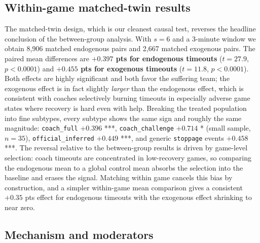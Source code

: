 \documentclass[twoside,11pt]{article}
\begin{document}
\subsection{Within-game matched-twin results}

The matched-twin design, which is our cleanest causal test, reverses the headline conclusion of the
between-group analysis. With $s = 6$ and a 3-minute window we obtain 8{,}906 matched endogenous pairs and
2{,}667 matched exogenous pairs. The paired mean differences are \textbf{$+0.397$ pts for endogenous
timeouts} ($t = 27.9$, $p < 0.0001$) and \textbf{$+0.455$ pts for exogenous timeouts} ($t = 11.8$,
$p < 0.0001$). Both effects are highly significant and both favor the suffering team; the exogenous effect
is in fact slightly \emph{larger} than the endogenous effect, which is consistent with coaches selectively
burning timeouts in especially adverse game states where recovery is hard even with help. Breaking the
treated population into fine subtypes, every subtype shows the same sign and roughly the same magnitude:
\texttt{coach\_full} $+0.396$ ***, \texttt{coach\_challenge} $+0.714$ * (small sample, $n = 35$),
\texttt{official\_inferred} $+0.449$ ***, and generic \texttt{stoppage} events $+0.458$ ***. The reversal
relative to the between-group results is driven by game-level selection: coach timeouts are concentrated in
low-recovery games, so comparing the endogenous mean to a global control mean absorbs the selection into the
baseline and erases the signal. Matching within game cancels this bias by construction, and a simpler
within-game mean comparison gives a consistent $+0.35$ pts effect for endogenous timeouts with the exogenous
effect shrinking to near zero.

\subsection{Mechanism and moderators}
\end{document}
